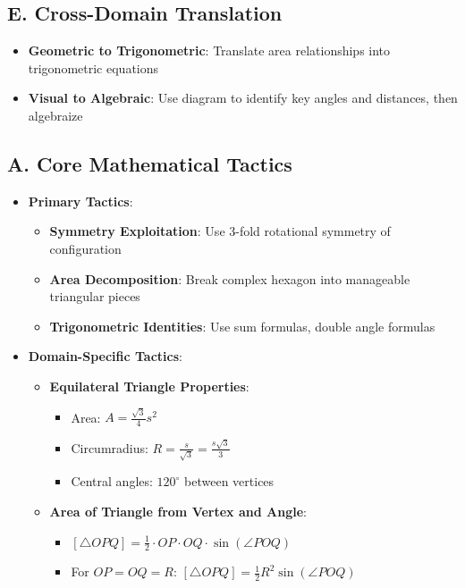\documentclass[12pt]{article}
\begin{document}
\begin{strategicbox}
\subsection*{E. Cross-Domain Translation}
\begin{itemize}[leftmargin=*]
    \item \textbf{Geometric to Trigonometric}: Translate area relationships into trigonometric equations
    
    \item \textbf{Visual to Algebraic}: Use diagram to identify key angles and distances, then algebraize
\end{itemize}
\end{strategicbox}

\begin{tacticalbox}
\subsection*{A. Core Mathematical Tactics}
\begin{itemize}[leftmargin=*]
    \item \textbf{Primary Tactics}: 
    \begin{itemize}
        \item \textbf{Symmetry Exploitation}: Use 3-fold rotational symmetry of configuration
        \item \textbf{Area Decomposition}: Break complex hexagon into manageable triangular pieces
        \item \textbf{Trigonometric Identities}: Use sum formulas, double angle formulas
    \end{itemize}
    
    \item \textbf{Domain-Specific Tactics}:
    \begin{itemize}
        \item \textbf{Equilateral Triangle Properties}:
        \begin{itemize}
            \item Area: $A = \frac{\sqrt{3}}{4}s^2$
            \item Circumradius: $R = \frac{s}{\sqrt{3}} = \frac{s\sqrt{3}}{3}$
            \item Central angles: $120^{\circ}$ between vertices
        \end{itemize}
        
        \item \textbf{Area of Triangle from Vertex and Angle}:
        \begin{itemize}
            \item $[\triangle OPQ] = \frac{1}{2} \cdot OP \cdot OQ \cdot \sin(\angle POQ)$
            \item For $OP = OQ = R$: $[\triangle OPQ] = \frac{1}{2}R^2 \sin(\angle POQ)$
        \end{itemize}
        

\end{itemize}
\end{itemize}
\end{tacticalbox}
\end{document}
